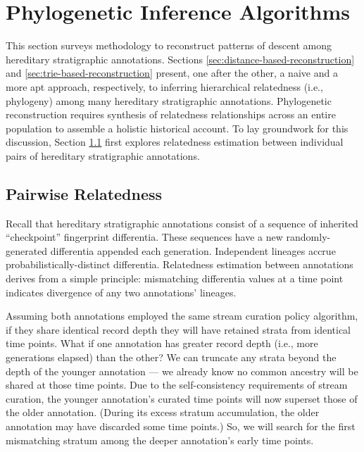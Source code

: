 \section{Phylogenetic Inference Algorithms} \label{sec:reconstruction-algorithm}

This section surveys methodology to reconstruct patterns of descent among hereditary stratigraphic annotations.  %
Sections \ref{sec:distance-based-reconstruction} and \ref{sec:trie-based-reconstruction} present, one after the other, a naive and a more apt approach, respectively, to inferring hierarchical relatedness (i.e., phylogeny) among many hereditary stratigraphic annotations.
Phylogenetic reconstruction requires synthesis of relatedness relationships across an entire population to assemble a holistic historical account.  %
To lay groundwork for this discussion, Section \ref{sec:pairwise-relatedness} first explores relatedness estimation between individual pairs of hereditary stratigraphic annotations.

\subsection{Pairwise Relatedness}
\label{sec:pairwise-relatedness}

Recall that hereditary stratigraphic annotations consist of a sequence of inherited ``checkpoint'' fingerprint differentia.
These sequences have a new randomly-generated differentia appended each generation.
Independent lineages accrue probabilistically-distinct differentia.
Relatedness estimation between annotations derives from a simple principle: mismatching differentia values at a time point indicates divergence of any two annotations' lineages.

Assuming both annotations employed the same stream curation policy algorithm, if they share identical record depth they will have retained strata from identical time points.
What if one annotation has greater record depth (i.e., more generations elapsed) than the other?
We can truncate any strata beyond the depth of the younger annotation --- we already know no common ancestry will be shared at those time points.
Due to the self-consistency requirements of stream curation, the younger annotation's curated time points will now superset those of the older annotation.
(During its excess stratum accumulation, the older annotation may have discarded some time points.)
So, we will search for the first mismatching stratum among the deeper annotation's early time points.

